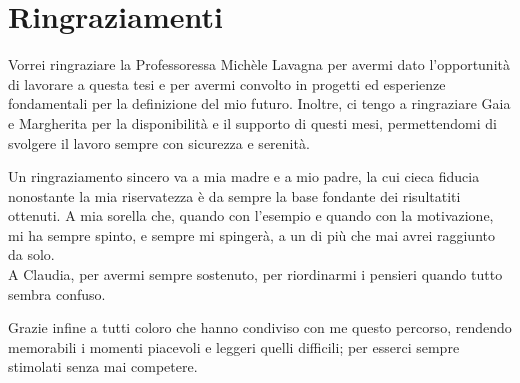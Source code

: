 \documentclass[12pt, twoside]{book}
\begin{document}
\pagestyle{empty}

\cleardoublepage





\chapter*{Ringraziamenti}
\thispagestyle{empty}
Vorrei ringraziare la Professoressa Michèle Lavagna per avermi dato l’opportunità di lavorare a questa tesi e per avermi convolto in progetti ed esperienze fondamentali per la definizione del mio futuro. Inoltre, ci tengo a ringraziare Gaia e Margherita per la disponibilità e il supporto di questi mesi, permettendomi di svolgere il lavoro sempre con sicurezza e serenità.

Un ringraziamento sincero va a mia madre e a mio padre, la cui cieca fiducia nonostante la mia riservatezza è da sempre la base fondante dei risultatiti ottenuti. A mia sorella che, quando con l’esempio e quando con la motivazione, mi ha sempre spinto, e sempre mi spingerà, a un di più che mai avrei raggiunto da solo.\\
A Claudia, per avermi sempre sostenuto, per riordinarmi i pensieri quando tutto sembra confuso.

Grazie infine a tutti coloro che hanno condiviso con me questo percorso, rendendo memorabili i momenti piacevoli e leggeri quelli difficili; per esserci sempre stimolati senza mai competere.



\cleardoublepage

\tableofcontents
\pagestyle{contents}


\listoffigures
\pagestyle{figures}
\newpage

\listoftables
\pagestyle{tables}
\newpage

\listofalgorithms
\pagestyle{algo}
\newpage 

\printglossary[type=\acronymtype,nonumberlist,title={List of Acronyms},nogroupskip]
\pagestyle{acro}
\newpage
\cleardoublepage

\pagestyle{generic}






\pagestyle{biblio}
\printbibliography
{}
\end{document}

